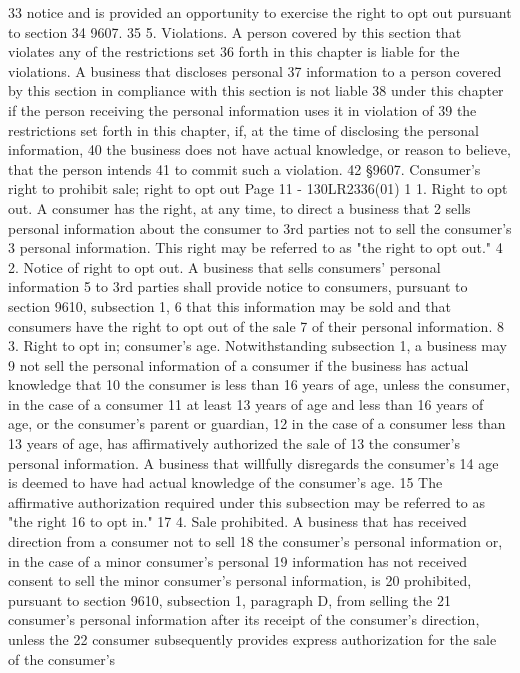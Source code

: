 33 notice and is provided an opportunity to exercise the right to opt out pursuant to section
34 9607.
35 5. Violations. A person covered by this section that violates any of the restrictions set
36 forth in this chapter is liable for the violations. A business that discloses personal
37 information to a person covered by this section in compliance with this section is not liable
38 under this chapter if the person receiving the personal information uses it in violation of
39 the restrictions set forth in this chapter, if, at the time of disclosing the personal information,
40 the business does not have actual knowledge, or reason to believe, that the person intends
41 to commit such a violation.
42 §9607. Consumer's right to prohibit sale; right to opt out
Page 11 - 130LR2336(01)
1 1. Right to opt out. A consumer has the right, at any time, to direct a business that
2 sells personal information about the consumer to 3rd parties not to sell the consumer's
3 personal information. This right may be referred to as "the right to opt out."
4 2. Notice of right to opt out. A business that sells consumers' personal information
5 to 3rd parties shall provide notice to consumers, pursuant to section 9610, subsection 1,
6 that this information may be sold and that consumers have the right to opt out of the sale
7 of their personal information.
8 3. Right to opt in; consumer's age. Notwithstanding subsection 1, a business may
9 not sell the personal information of a consumer if the business has actual knowledge that
10 the consumer is less than 16 years of age, unless the consumer, in the case of a consumer
11 at least 13 years of age and less than 16 years of age, or the consumer's parent or guardian,
12 in the case of a consumer less than 13 years of age, has affirmatively authorized the sale of
13 the consumer's personal information. A business that willfully disregards the consumer's
14 age is deemed to have had actual knowledge of the consumer's age.
15 The affirmative authorization required under this subsection may be referred to as "the right
16 to opt in."
17 4. Sale prohibited. A business that has received direction from a consumer not to sell
18 the consumer's personal information or, in the case of a minor consumer's personal
19 information has not received consent to sell the minor consumer's personal information, is
20 prohibited, pursuant to section 9610, subsection 1, paragraph D, from selling the
21 consumer's personal information after its receipt of the consumer's direction, unless the
22 consumer subsequently provides express authorization for the sale of the consumer's
